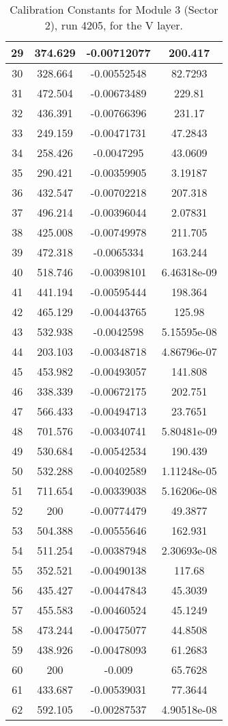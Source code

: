 \begin{table}[h]
{\begin{tabular}{|c|c|c|c|}
29	&	374.629	&	-0.00712077	&	200.417	\\	\hline
30	&	328.664	&	-0.00552548	&	82.7293	\\	\hline
31	&	472.504	&	-0.00673489	&	229.81	\\	\hline
32	&	436.391	&	-0.00766396	&	231.17	\\	\hline
33	&	249.159	&	-0.00471731	&	47.2843	\\	\hline
34	&	258.426	&	-0.0047295	&	43.0609	\\	\hline
35	&	290.421	&	-0.00359905	&	3.19187	\\	\hline
36	&	432.547	&	-0.00702218	&	207.318	\\	\hline
37	&	496.214	&	-0.00396044	&	2.07831	\\	\hline
38	&	425.008	&	-0.00749978	&	211.705	\\	\hline
39	&	472.318	&	-0.0065334	&	163.244	\\	\hline
40	&	518.746	&	-0.00398101	&	6.46318e-09	\\	\hline
41	&	441.194	&	-0.00595444	&	198.364	\\	\hline
42	&	465.129	&	-0.00443765	&	125.98	\\	\hline
43	&	532.938	&	-0.0042598	&	5.15595e-08	\\	\hline
44	&	203.103	&	-0.00348718	&	4.86796e-07	\\	\hline
45	&	453.982	&	-0.00493057	&	141.808	\\	\hline
46	&	338.339	&	-0.00672175	&	202.751	\\	\hline
47	&	566.433	&	-0.00494713	&	23.7651	\\	\hline
48	&	701.576	&	-0.00340741	&	5.80481e-09	\\	\hline
49	&	530.684	&	-0.00542534	&	190.439	\\	\hline
50	&	532.288	&	-0.00402589	&	1.11248e-05	\\	\hline
51	&	711.654	&	-0.00339038	&	5.16206e-08	\\	\hline
52	&	200	&	-0.00774479	&	49.3877	\\	\hline
53	&	504.388	&	-0.00555646	&	162.931	\\	\hline
54	&	511.254	&	-0.00387948	&	2.30693e-08	\\	\hline
55	&	352.521	&	-0.00490138	&	117.68	\\	\hline
56	&	435.427	&	-0.00447843	&	45.3039	\\	\hline
57	&	455.583	&	-0.00460524	&	45.1249	\\	\hline
58	&	473.244	&	-0.00475077	&	44.8508	\\	\hline
59	&	438.926	&	-0.00478093	&	61.2683	\\	\hline
60	&	200	&	-0.009	&	65.7628	\\	\hline
61	&	433.687	&	-0.00539031	&	77.3644	\\	\hline
62	&	592.105	&	-0.00287537	&	4.90518e-08	\\	\hline
            \end{tabular}
        }
        \caption{Calibration Constants for Module 3 (Sector 2), run 4205, for the V layer.}
\end{table}


